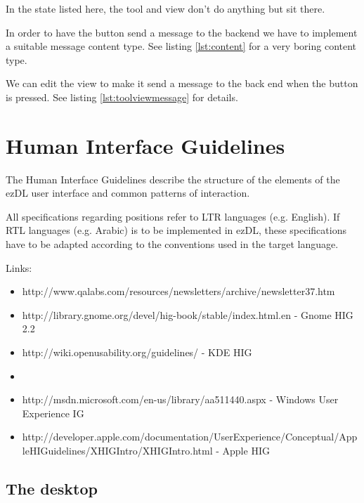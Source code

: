 \documentclass[12pt]{book}
\newcommand{\lllhome}{../../../examples/src/main/java/de/unidue/inf/is/ezdl/examples/}
\begin{document}
In the state listed here, the tool and view don't do anything but sit there. 

In order to have the button send a message to the backend we have to implement a suitable message content type. See listing \ref{lst:content} for a very boring content type.




We can edit the view to make it send a message to the back end when the button is pressed. See listing \ref{lst:toolviewmessage} for details.






%
%
%
%
%
\chapter{Human Interface Guidelines}

The Human Interface Guidelines describe the structure of the elements of the ezDL user interface and common patterns of interaction.

All specifications regarding positions refer to LTR languages (e.g. English). If RTL languages (e.g. Arabic) is to be implemented in ezDL, these specifications have to be adapted according to the conventions used in the target language.


Links:
\begin{itemize}
\item http://www.qalabs.com/resources/newsletters/archive/newsletter37.htm
\item http://library.gnome.org/devel/hig-book/stable/index.html.en - Gnome HIG 2.2
\item http://wiki.openusability.org/guidelines/ - KDE HIG
\item \item http://msdn.microsoft.com/en-us/library/aa511440.aspx - Windows User Experience IG
\item http://developer.apple.com/documentation/UserExperience/Conceptual/AppleHIGuidelines/XHIGIntro/XHIGIntro.html - Apple HIG
\end{itemize}


\section{The desktop}
\end{document}
